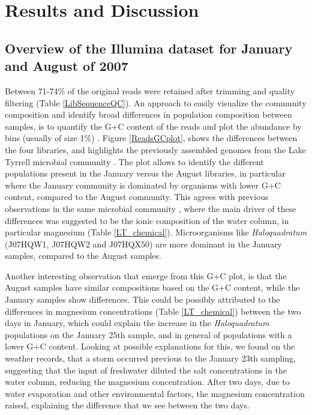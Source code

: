 \clearpage
\section{Results and Discussion}

\subsection{Overview of the Illumina dataset for January and August of 2007}

Between 71-74\% of the original reads were retained after trimming and quality filtering (Table \ref{LibSequenceQC}). An approach to easily visualize the community composition and identify broad differences in population composition between samples, is to quantify the G+C content of the reads and plot the abundance by bins (usually of size 1\%) \cite{Podell:2013kx,Ghai:2012fb,Podell:2013fp}. Figure \ref{ReadsGCplot}, shows the differences between the four libraries, and highlights the previously assembled genomes from the Lake Tyrrell microbial community \cite{Narasingarao:2012kp,Podell:2013kx,Podell:2013fp}. The plot allows to identify the different populations present in the January versus the August libraries, in particular where the January community is dominated by organisms with lower G+C content, compared to the August community. This agrees with previous observations in the same microbial community \cite{Podell:2013fp}, where the main driver of these differences was suggested to be the ionic composition of the water column, in particular magnesium (Table \ref{LT_chemical}). Microorganisms like \textit{Haloquadratum} (J07HQW1, J07HQW2 and J07HQX50) are more dominant in the January samples, compared to the August samples. 

Another interesting observation that emerge from this G+C plot, is that the August samples have similar compositions based on the G+C content, while the January samples show differences. This could be possibly attributed to the differences in magnesium concentrations (Table \ref{LT_chemical}) between the two days in January, which could explain the increase in the \textit{Haloquadratum} populations on the January 25th sample, and in general of populations with a lower G+C content. Looking at possible explanations for this, we found on the weather records, that a storm occurred previous to the January 23th sampling, suggesting that the input of freshwater diluted the salt concentrations in the water column, reducing the magnesium concentration. After two days, due to water evaporation and other environmental factors, the magnesium concentration raised, explaining the difference that we see between the two days.



